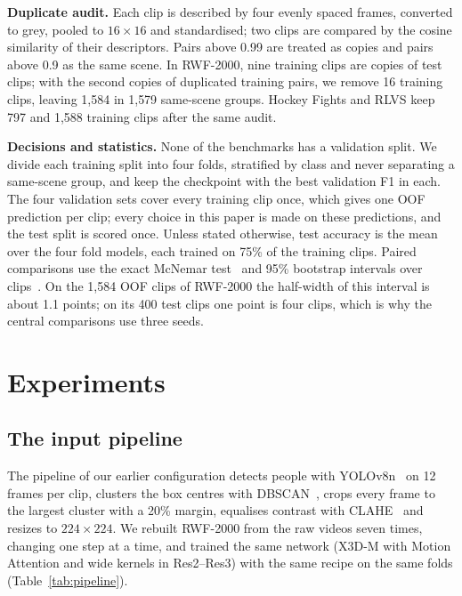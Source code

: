 \documentclass[runningheads]{llncs}
\begin{document}
\textbf{Duplicate audit.} Each clip is described by four evenly spaced
frames, converted to grey, pooled to $16\times16$ and standardised; two
clips are compared by the cosine similarity of their descriptors. Pairs
above 0.99 are treated as copies and pairs above 0.9 as the same scene. In
RWF-2000, nine training clips are copies of test clips; with the second
copies of duplicated training pairs, we remove 16 training clips, leaving
1{,}584 in 1{,}579 same-scene groups. Hockey Fights and RLVS keep 797 and
1{,}588 training clips after the same audit.

\textbf{Decisions and statistics.} None of the benchmarks has a validation
split. We divide each training split into four folds, stratified by class
and never separating a same-scene group, and keep the checkpoint with the
best validation F1 in each. The four validation sets cover every training
clip once, which gives one OOF prediction per clip; every choice in this
paper is made on these predictions, and the test split is scored once.
Unless stated otherwise, test accuracy is the mean over the four fold
models, each trained on 75\% of the training clips. Paired comparisons use
the exact McNemar test~\cite{mcnemar} and 95\% bootstrap intervals over
clips~\cite{bootstrap}. On the 1{,}584 OOF clips of RWF-2000 the half-width
of this interval is about 1.1 points; on its 400 test clips one point is
four clips, which is why the central comparisons use three seeds.

\section{Experiments}
\label{sec:results}

\subsection{The input pipeline}
\label{sec:pipeline}

The pipeline of our earlier configuration detects people with
YOLOv8n~\cite{yolov8} on 12 frames per clip, clusters the box centres with
DBSCAN~\cite{dbscan}, crops every frame to the largest cluster with a 20\%
margin, equalises contrast with CLAHE~\cite{clahe} and resizes to
$224\times224$. We rebuilt RWF-2000 from the raw videos seven times,
changing one step at a time, and trained the same network (X3D-M with
Motion Attention and wide kernels in Res2--Res3) with the same recipe on the
same folds (Table~\ref{tab:pipeline}).
\end{document}
